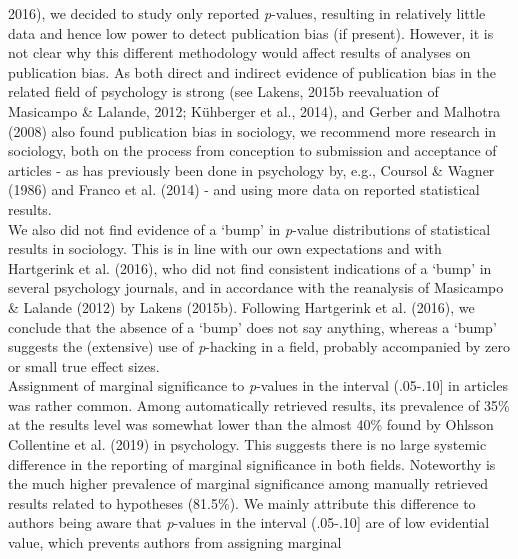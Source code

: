 \documentclass[
  12pt,
]{article}
\begin{document}
2016), we decided to study only reported \emph{p}-values, resulting in
relatively little data and hence low power to detect publication bias
(if present). However, it is not clear why this different methodology
would affect results of analyses on publication bias. As both direct and
indirect evidence of publication bias in the related field of psychology
is strong (see Lakens, 2015b reevaluation of Masicampo \& Lalande, 2012;
Kühberger et al., 2014), and Gerber and Malhotra (2008) also found
publication bias in sociology, we recommend more research in sociology,
both on the process from conception to submission and acceptance of
articles - as has previously been done in psychology by, e.g., Coursol
\& Wagner (1986) and Franco et al. (2014) - and using more data on
reported statistical results.~\\
\hspace*{0.333em}\hspace*{0.333em}\hspace*{0.333em}\hspace*{0.333em}We
also did not find evidence of a `bump' in \emph{p}-value distributions
of statistical results in sociology. This is in line with our own
expectations and with Hartgerink et al. (2016), who did not find
consistent indications of a `bump' in several psychology journals, and
in accordance with the reanalysis of Masicampo \& Lalande (2012) by
Lakens (2015b). Following Hartgerink et al. (2016), we conclude that the
absence of a `bump' does not say anything, whereas a `bump' suggests the
(extensive) use of \emph{p}-hacking in a field, probably accompanied by
zero or small true effect sizes.~\\
\hspace*{0.333em}\hspace*{0.333em}\hspace*{0.333em}\hspace*{0.333em}Assignment
of marginal significance to \emph{p}-values in the interval (.05-.10{]}
in articles was rather common. Among automatically retrieved results,
its prevalence of 35\% at the results level was somewhat lower than the
almost 40\% found by Ohlsson Collentine et al. (2019) in psychology.
This suggests there is no large systemic difference in the reporting of
marginal significance in both fields. Noteworthy is the much higher
prevalence of marginal significance among manually retrieved results
related to hypotheses (81.5\%). We mainly attribute this difference to
authors being aware that \emph{p}-values in the interval (.05-.10{]} are
of low evidential value, which prevents authors from assigning marginal
\end{document}
